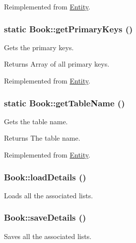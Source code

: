 Reimplemented from \hyperlink{classEntity_ad69437219c10955803707fbf6ac458e7}{Entity}.

\hypertarget{classBook_ae2a08ea5916ed402169f59b6ad853d13}{
\subsubsection[{getPrimaryKeys}]{\setlength{\rightskip}{0pt plus 5cm}static Book::getPrimaryKeys ()}}
\label{classBook_ae2a08ea5916ed402169f59b6ad853d13}
Gets the primary keys.

\begin{DoxyReturn}{Returns}
Array of all primary keys. 
\end{DoxyReturn}


Reimplemented from \hyperlink{classEntity_a61bbfbb4058427174e002a09ddc77c41}{Entity}.

\hypertarget{classBook_ae4b3d3747fad76af4e4724a4bcf749a3}{
\subsubsection[{getTableName}]{\setlength{\rightskip}{0pt plus 5cm}static Book::getTableName ()}}
\label{classBook_ae4b3d3747fad76af4e4724a4bcf749a3}
Gets the table name.

\begin{DoxyReturn}{Returns}
The table name. 
\end{DoxyReturn}


Reimplemented from \hyperlink{classEntity_a8305fd94740ac62cbafb9de76567ce37}{Entity}.

\hypertarget{classBook_aa3c048838c2e1f68941d8074d517eb2e}{
\subsubsection[{loadDetails}]{\setlength{\rightskip}{0pt plus 5cm}Book::loadDetails ()}}
\label{classBook_aa3c048838c2e1f68941d8074d517eb2e}
Loads all the associated lists. \hypertarget{classBook_a746ae3bbd059bbc55d3ab6e578105ad8}{
\subsubsection[{saveDetails}]{\setlength{\rightskip}{0pt plus 5cm}Book::saveDetails ()}}
\label{classBook_a746ae3bbd059bbc55d3ab6e578105ad8}
Saves all the associated lists. 

